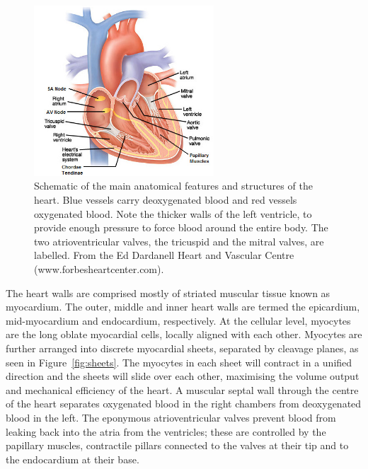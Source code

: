   \begin{figure}[htbp]
    \centering
    \includegraphics[width=0.6\textwidth]{Ch2/Figs/interior_heart_anatomy}
    \caption{Schematic of the main anatomical features and structures of the heart. Blue vessels carry deoxygenated blood and red vessels oxygenated blood. Note the thicker walls of the left ventricle, to provide enough pressure to force blood around the entire body. The two atrioventricular valves, the tricuspid and the mitral valves, are labelled. From the Ed Dardanell Heart and Vascular Centre (www.forbesheartcenter.com).}
    \label{fig:heart}
  \end{figure}  

The heart walls are comprised mostly of striated muscular tissue known as myocardium. The outer, middle and inner heart walls are termed the epicardium, mid-myocardium and endocardium, respectively. At the cellular level, myocytes are the long oblate myocardial cells, locally aligned with each other. Myocytes are further arranged into discrete myocardial sheets, separated by cleavage planes, as seen in Figure~\ref{fig:sheets}. The myocytes in each sheet will contract in a unified direction and the sheets will slide over each other, maximising the volume output and mechanical efficiency of the heart. A muscular septal wall through the centre of the heart separates oxygenated blood in the right chambers from deoxygenated blood in the left. The eponymous atrioventricular valves prevent blood from leaking back into the atria from the ventricles; these are controlled by the papillary muscles, contractile pillars connected to the valves at their tip and to the endocardium at their base.


